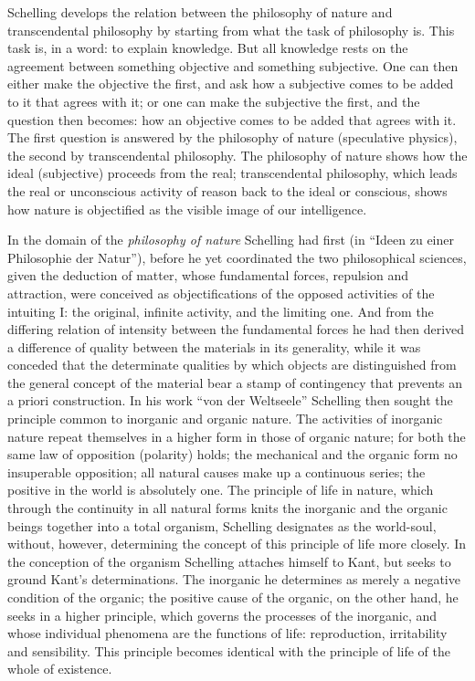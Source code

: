Schelling develops the relation between the philosophy of nature and
transcendental philosophy by starting from what the task of philosophy
is. This task is, in a word: to explain knowledge. But all knowledge
rests on the agreement between something objective and something
subjective. One can then either make the objective the first, and ask
how a subjective comes to be added to it that agrees with it; or one can
make the subjective the first, and the question then becomes: how an
objective comes to be added that agrees with it. The first question is
answered by the philosophy of nature (speculative physics), the second by
transcendental philosophy. The philosophy of nature shows how the ideal
(subjective) proceeds from the real; transcendental philosophy, which
leads the real or unconscious activity of reason back to the ideal or
conscious, shows how nature is objectified as the visible image of our
intelligence.

In the domain of the \emph{philosophy of nature} Schelling had first (in
``Ideen zu einer Philosophie der Natur''), before he yet coordinated the
two philosophical sciences, given the deduction of matter, whose
fundamental forces, repulsion and attraction, were conceived as
objectifications of the opposed activities of the intuiting I: the
original, infinite activity, and the limiting one. And from the differing
relation of intensity between the fundamental forces he had then derived
a difference of quality between the materials in its generality, while
it was conceded that the determinate qualities by which objects are
distinguished from the general concept of the material bear a stamp of
contingency that prevents an a priori construction. In his
work ``von der Weltseele'' Schelling then sought the principle
common to inorganic and organic nature. The activities of inorganic
nature repeat themselves in a higher form in those of organic nature; for
both the same law of opposition (polarity) holds; the mechanical and the
organic form no insuperable opposition; all natural causes make up a
continuous series; the positive in the world is absolutely one. The
principle of life in nature, which through the continuity in all natural
forms knits the inorganic and the organic beings together into a total
organism, Schelling designates as the world-soul, without, however,
determining the concept of this principle of life more closely. In the
conception of the organism Schelling attaches himself to Kant, but seeks
to ground Kant's determinations. The inorganic he determines as merely a
negative condition of the organic; the positive cause of the organic, on
the other hand, he seeks in a higher principle, which governs the
processes of the inorganic, and whose individual phenomena are the
functions of life: reproduction, irritability and sensibility. This
principle becomes identical with the principle of life of the whole of
existence.

